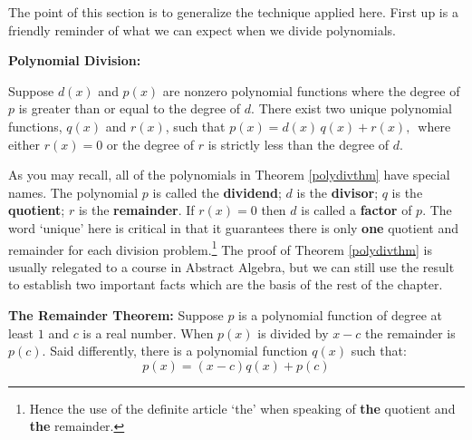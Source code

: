 \documentclass{ximera}
\begin{document}
The point of this section is to generalize the technique applied here.  First up is a friendly reminder of what we can expect when we divide polynomials.

\smallskip


\begin{theorem} \label{polydivthm} \textbf{Polynomial Division:} 

Suppose $d(x)$ and $p(x)$ are nonzero polynomial functions where the degree of $p$ is greater than or equal to the degree of $d$.  There exist two unique polynomial functions, $q(x)$ and $r(x)$, such that $p(x) = d(x) \, q(x) + r(x),\,$ where either $r(x) = 0$ or the degree of $r$ is strictly less than the degree of $d$.
\end{theorem}

\medskip

As you may recall, all of the polynomials in Theorem \ref{polydivthm} have special names.  The polynomial $p$ is called the  \textbf{dividend}; $d$ is the  \textbf{divisor}; $q$ is the  \textbf{quotient}; $r$ is the  \textbf{remainder}.  If $r(x)=0$ then $d$ is called a  \textbf{factor} of $p$.  The word `unique' here is critical in that it guarantees there is only \textbf{one} quotient and remainder for each division problem.\footnote{Hence the use of the definite article `the' when speaking of \textbf{the} quotient and \textbf{the} remainder.} The proof of Theorem \ref{polydivthm} is usually relegated to a course in Abstract Algebra, but we can still use the result to establish two important facts which are the basis of the rest of the chapter.

\medskip


\begin{theorem} \label{remainderthm}\textbf{The Remainder Theorem:}  
Suppose $p$ is a polynomial function of degree at least $1$ and $c$ is a real number.  When $p(x)$ is divided by $x-c$ the remainder is $p(c)$.  Said differently, there is a polynomial  function $q(x)$ such that:  \[ p(x) = (x-c) q(x) + p(c)\]

\end{theorem}

\medskip
\end{document}
